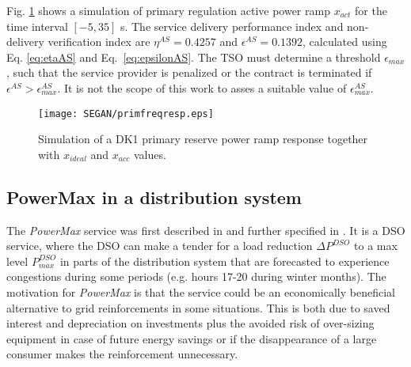 Fig. \ref{fig:DK1PrimResSim} shows a simulation of primary regulation active power ramp $x_{act}$ for the time interval $[-5,35]$ s. The service delivery performance index and non-delivery verification index are $\eta^{AS}=0.4257$ and $\epsilon^{AS}=0.1392$, calculated using Eq. \eqref{eq:etaAS} and Eq.~\eqref{eq:epsilonAS}. The TSO must determine a threshold $\epsilon_{max}$, such that the service provider is penalized or the contract is terminated if $\epsilon^{AS}>\epsilon^{AS}_{max}$. It is not the scope of this work to asses a suitable value of $\epsilon^{AS}_{max}$.%

\begin{figure}
\centering
\texttt{[image: SEGAN/primfreqresp.eps]}
\caption{Simulation of a DK1 primary reserve power ramp response together with $x_{ideal}$ and $x_{acc}$ values.}
\label{fig:DK1PrimResSim}
\end{figure}

\subsection{PowerMax in a distribution system}
The \textit{PowerMax} service was first described in \cite{ding2013development} and further specified in \cite{bondy2014flech}. It is a DSO service, where the DSO can make a tender for a load reduction $\Delta P^{DSO}$ to a max level $P_{max}^{DSO}$ in parts of the distribution system that are forecasted to experience congestions during some periods (e.g. hours 17-20 during winter months). The motivation for \textit{PowerMax} is that the service could be an economically beneficial alternative to grid reinforcements in some situations. This is both due to saved interest and depreciation on investments plus the avoided risk of over-sizing equipment in case of future energy savings or if the disappearance of a large consumer makes the reinforcement unnecessary.%

